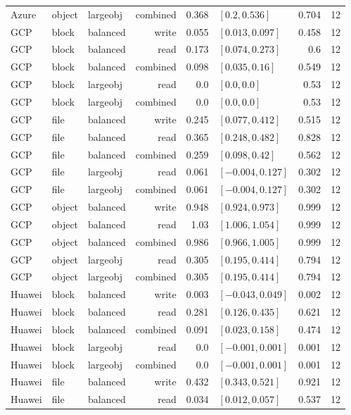 \begin{tabular}{lllrrlrl}
Azure & object & largeobj & combined & 0.368 & $[0.2, 0.536]$ & 0.704 & 12 \\
GCP & block & balanced & write & 0.055 & $[0.013, 0.097]$ & 0.458 & 12 \\
GCP & block & balanced & read & 0.173 & $[0.074, 0.273]$ & 0.6 & 12 \\
GCP & block & balanced & combined & 0.098 & $[0.035, 0.16]$ & 0.549 & 12 \\
GCP & block & largeobj & read & 0.0 & $[0.0, 0.0]$ & 0.53 & 12 \\
GCP & block & largeobj & combined & 0.0 & $[0.0, 0.0]$ & 0.53 & 12 \\
GCP & file & balanced & write & 0.245 & $[0.077, 0.412]$ & 0.515 & 12 \\
GCP & file & balanced & read & 0.365 & $[0.248, 0.482]$ & 0.828 & 12 \\
GCP & file & balanced & combined & 0.259 & $[0.098, 0.42]$ & 0.562 & 12 \\
GCP & file & largeobj & read & 0.061 & $[-0.004, 0.127]$ & 0.302 & 12 \\
GCP & file & largeobj & combined & 0.061 & $[-0.004, 0.127]$ & 0.302 & 12 \\
GCP & object & balanced & write & 0.948 & $[0.924, 0.973]$ & 0.999 & 12 \\
GCP & object & balanced & read & 1.03 & $[1.006, 1.054]$ & 0.999 & 12 \\
GCP & object & balanced & combined & 0.986 & $[0.966, 1.005]$ & 0.999 & 12 \\
GCP & object & largeobj & read & 0.305 & $[0.195, 0.414]$ & 0.794 & 12 \\
GCP & object & largeobj & combined & 0.305 & $[0.195, 0.414]$ & 0.794 & 12 \\
Huawei & block & balanced & write & 0.003 & $[-0.043, 0.049]$ & 0.002 & 12 \\
Huawei & block & balanced & read & 0.281 & $[0.126, 0.435]$ & 0.621 & 12 \\
Huawei & block & balanced & combined & 0.091 & $[0.023, 0.158]$ & 0.474 & 12 \\
Huawei & block & largeobj & read & 0.0 & $[-0.001, 0.001]$ & 0.001 & 12 \\
Huawei & block & largeobj & combined & 0.0 & $[-0.001, 0.001]$ & 0.001 & 12 \\
Huawei & file & balanced & write & 0.432 & $[0.343, 0.521]$ & 0.921 & 12 \\
Huawei & file & balanced & read & 0.034 & $[0.012, 0.057]$ & 0.537 & 12 \\

\end{tabular}
